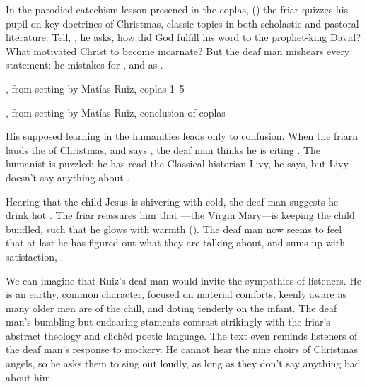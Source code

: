 In the parodied catechism lesson presened in the coplas, () the friar quizzes his pupil on key doctrines of Christmas, classic topics in both scholastic and pastoral literature:
Tell, , he asks, how did God fulfill his word to the prophet-king David?
What motivated Christ to become incarnate?
But the deaf man mishears every statement: he mistakes  for , and  as .

\begin{expoem}
\caption{, from setting by Matías Ruiz, coplas 1--5}
\label{expoem:Pues_la_fiesta-Ruiz-coplas-1}
\end{expoem}

\begin{expoem}
\caption{, from setting by Matías Ruiz, conclusion of coplas}
\label{expoem:Pues_la_fiesta-Ruiz-coplas-2}
\end{expoem}

His supposed learning in the humanities leads only to confusion.
When the friarn lauds the  of Christmas, and says , the deaf man thinks he is citing .
The humanist is puzzled: he has read the Classical historian Livy, he says, but Livy doesn't say anything about .

Hearing that the child Jesus is shivering with cold, the deaf man suggests he drink hot .
The friar reassures him that ---the Virgin Mary---is keeping the child bundled, such that he glows with warmth ().
The deaf man now seems to feel that at last he has figured out what they are talking about, and sums up with satisfaction, .

We can imagine that Ruiz's deaf man would invite the sympathies of listeners.
He is an earthy, common character, focused on material comforts, keenly aware as many older men are of the chill, and doting tenderly on the infant.
The deaf man's bumbling but endearing staments contrast strikingly with the friar's abstract theology and clichéd poetic language.
The text even reminds listeners of the deaf man's response to mockery.
He cannot hear the nine choirs of Christmas angels, so he asks them to sing out loudly, as long as they don't say anything bad about him.

